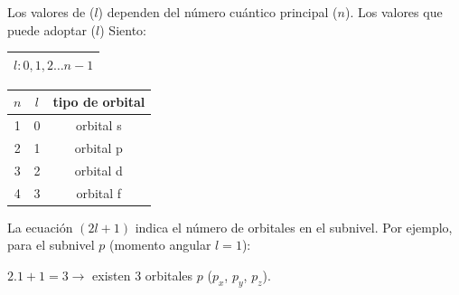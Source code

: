             \indent Los valores de ($l$) dependen del número cuántico principal ($n$). Los valores que puede adoptar ($l$) Siento:

            \begin{center} 
                \begin{tabular}{| c |}
                    \hline
                    $l: 0,1,2 \dots n-1$ \\
                    \hline
                \end{tabular}
            \end{center}

            \begin{center} 
                \begin{tabular}{|| c | c | c ||}
                    \hline
                    \textbf{$n$} & \textbf{$l$} & \textbf{tipo de orbital} \\
                    \hline
                    \hline
                    1 & 0 & orbital s \\
                    2 & 1 & orbital p \\
                    3 & 2 & orbital d \\
                    4 & 3 & orbital f \\
                    \hline
                \end{tabular}
            \end{center}

            \indent La ecuación $(2l + 1)$ indica el número de orbitales en el subnivel. Por ejemplo, para el subnivel $p$ (momento angular $l = 1$):
            \begin{center} 
                $ 2 . 1 + 1 = 3 \rightarrow$ existen 3 orbitales $p$ ($p_x$, $p_y$, $p_z$).
            \end{center}

